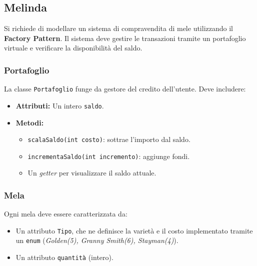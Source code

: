 \documentclass{article}
\begin{document}
\subsection{Melinda}
Si richiede di modellare un sistema di compravendita di mele utilizzando il \textbf{Factory Pattern}. Il sistema deve gestire le transazioni tramite un portafoglio virtuale e verificare la disponibilità del saldo.


\subsubsection*{Portafoglio}
La classe \texttt{Portafoglio} funge da gestore del credito dell'utente. Deve includere:
\begin{itemize}
    \item \textbf{Attributi:} Un intero \texttt{saldo}.
    \item \textbf{Metodi:} 
        \begin{itemize}
            \item \texttt{scalaSaldo(int costo)}: sottrae l'importo dal saldo.
            \item \texttt{incrementaSaldo(int incremento)}: aggiunge fondi.
            \item Un \textit{getter} per visualizzare il saldo attuale.
        \end{itemize}
\end{itemize}

\subsubsection*{Mela}
Ogni mela deve essere caratterizzata da:
\begin{itemize}
    \item Un attributo \texttt{Tipo}, che ne definisce la varietà e il costo implementato tramite un \texttt{enum} (\textit{Golden(5), Granny Smith(6), Stayman(4)}).
    \item Un attributo \texttt{quantità} (intero).
\end{itemize}
\end{document}

